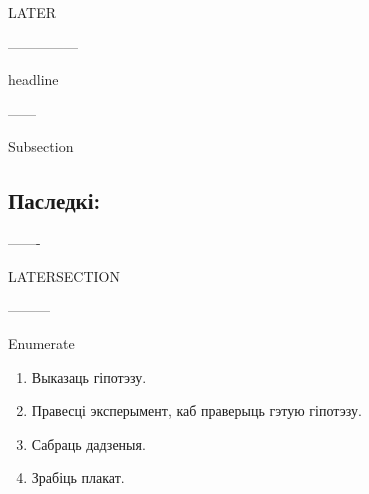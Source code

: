LATER 

\later

---------------

headline


------

Subsection

\subsection{Паследкі:}

\pagebreak

-------

LATERSECTION  
\nopagebreak
{}

---------

Enumerate 

\begin{enumerate}[Крок 1:]\firmlist
    \item Выказаць гіпотэзу.
    \item Правесці эксперымент, каб праверыць гэтую гіпотэзу.
    \item Сабраць дадзеныя.
    \item Зрабіць плакат.
    \end{enumerate}




